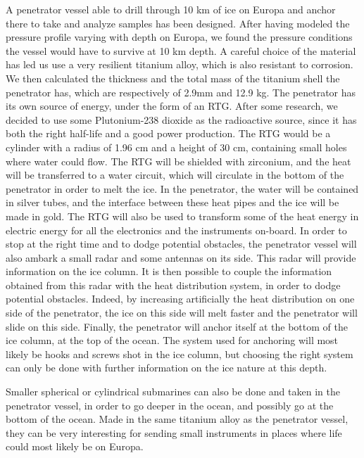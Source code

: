 A penetrator vessel able to drill through 10 km of ice on Europa and anchor there to take and analyze samples has been designed. After having modeled the pressure profile varying with depth on Europa, we found the pressure conditions the vessel would have to survive at 10 km depth. A careful choice of the material has led us use a very resilient titanium alloy, which is also resistant to corrosion. We then calculated the thickness and the total mass of the titanium shell the penetrator has, which are respectively of 2.9mm and 12.9 kg.
The penetrator has its own source of energy, under the form of an RTG. After some research, we decided to use some Plutonium-238 dioxide as the radioactive source, since it has both the right half-life and a good power production. The RTG would be a cylinder with a radius of 1.96 cm  and a height of 30 cm, containing small holes where water could flow. The RTG will be shielded with zirconium, and the heat will be transferred to a water circuit, which will circulate in the bottom of the penetrator in order to melt the ice. In the penetrator, the water will be contained in silver tubes, and the interface between these heat pipes and the ice will be made in gold.
The RTG will also be used to transform some of the heat energy in electric energy for all the electronics and the instruments on-board.
In order to stop at the right time and to dodge potential obstacles, the penetrator vessel will also ambark a small  radar and some antennas on its side. This radar will provide information on the ice column. It is then possible to couple the information obtained from this radar with the heat distribution system, in order to dodge potential obstacles. Indeed, by increasing artificially the heat distribution on one side of the penetrator, the ice on this side  will melt faster and the penetrator will slide on this side.
Finally, the penetrator will anchor itself at the bottom of the ice column, at the top of the ocean. The system used for anchoring will most likely be hooks and screws shot in the ice column, but choosing the right system can only be done with further information on the ice nature at this depth.

Smaller spherical or cylindrical submarines can also be done and taken in the penetrator vessel, in order to go deeper in the ocean, and possibly go at the bottom of the ocean. Made in the same titanium alloy as the penetrator vessel, they can be very interesting for sending small instruments in places where life could most likely be on Europa.


